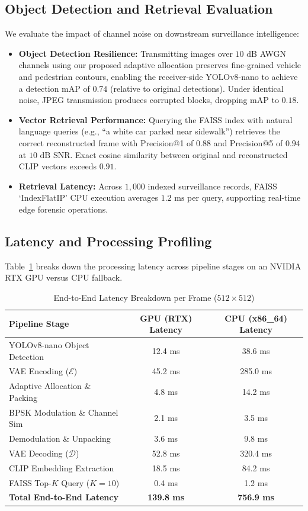 \documentclass[journal,twocolumn]{IEEEtran}
\begin{document}
\subsection{Object Detection and Retrieval Evaluation}
We evaluate the impact of channel noise on downstream surveillance intelligence:
\begin{itemize}
    \item \textbf{Object Detection Resilience:} Transmitting images over $10\text{ dB}$ AWGN channels using our proposed adaptive allocation preserves fine-grained vehicle and pedestrian contours, enabling the receiver-side YOLOv8-nano to achieve a detection mAP of $0.74$ (relative to original detections). Under identical noise, JPEG transmission produces corrupted blocks, dropping mAP to $0.18$.
    \item \textbf{Vector Retrieval Performance:} Querying the FAISS index with natural language queries (e.g., ``a white car parked near sidewalk'') retrieves the correct reconstructed frame with Precision@1 of $0.88$ and Precision@5 of $0.94$ at $10\text{ dB}$ SNR. Exact cosine similarity between original and reconstructed CLIP vectors exceeds $0.91$.
    \item \textbf{Retrieval Latency:} Across $1,000$ indexed surveillance records, FAISS `IndexFlatIP' CPU execution averages $1.2\text{ ms}$ per query, supporting real-time edge forensic operations.
\end{itemize}

\subsection{Latency and Processing Profiling}
Table~\ref{tab:latency_profiling} breaks down the processing latency across pipeline stages on an NVIDIA RTX GPU versus CPU fallback.

\begin{table}[h]
\centering
\caption{End-to-End Latency Breakdown per Frame ($512 \times 512$)}
\label{tab:latency_profiling}
\small
\begin{tabular}{lcc}
\toprule
\textbf{Pipeline Stage} & \textbf{GPU (RTX) Latency} & \textbf{CPU (x86\_64) Latency} \\
\midrule
YOLOv8-nano Object Detection & 12.4 ms & 38.6 ms \\
VAE Encoding ($\mathcal{E}$) & 45.2 ms & 285.0 ms \\
Adaptive Allocation \& Packing & 4.8 ms & 14.2 ms \\
BPSK Modulation \& Channel Sim & 2.1 ms & 3.5 ms \\
Demodulation \& Unpacking & 3.6 ms & 9.8 ms \\
VAE Decoding ($\mathcal{D}$) & 52.8 ms & 320.4 ms \\
CLIP Embedding Extraction & 18.5 ms & 84.2 ms \\
FAISS Top-$K$ Query ($K=10$) & 0.4 ms & 1.2 ms \\
\midrule
\textbf{Total End-to-End Latency} & \textbf{139.8 ms} & \textbf{756.9 ms} \\
\bottomrule
\end{tabular}
\end{table}
\end{document}
